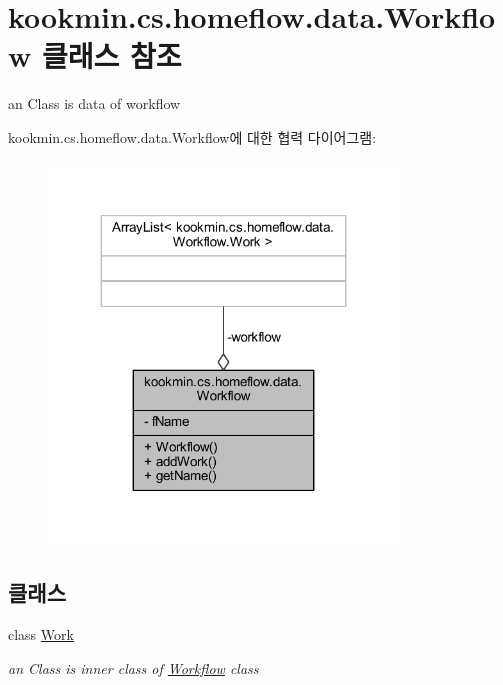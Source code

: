 \hypertarget{classkookmin_1_1cs_1_1homeflow_1_1data_1_1_workflow}{}\section{kookmin.\+cs.\+homeflow.\+data.\+Workflow 클래스 참조}
\label{classkookmin_1_1cs_1_1homeflow_1_1data_1_1_workflow}


an Class is data of workflow  




kookmin.\+cs.\+homeflow.\+data.\+Workflow에 대한 협력 다이어그램\+:
\nopagebreak
\begin{figure}[H]
\begin{center}
\leavevmode
\includegraphics[width=263pt]{classkookmin_1_1cs_1_1homeflow_1_1data_1_1_workflow__coll__graph}
\end{center}
\end{figure}
\subsection*{클래스}
\begin{DoxyCompactItemize}
\item 
class \hyperlink{classkookmin_1_1cs_1_1homeflow_1_1data_1_1_workflow_1_1_work}{Work}
\begin{DoxyCompactList}\small\item\em an Class is inner class of \hyperlink{classkookmin_1_1cs_1_1homeflow_1_1data_1_1_workflow}{Workflow} class \end{DoxyCompactList}\end{DoxyCompactItemize}
